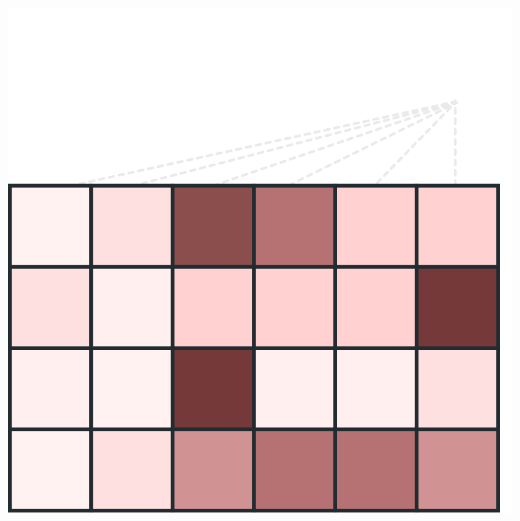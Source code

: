 \documentclass[xetex,aspectratio=169,xcolor,professionalfonts,hyperref]{beamer}
\begin{document}
\begin{frame}
\begin{columns}
\begin{column}{0.39\columnwidth}
            \vspace{-1.5cm}
            \begin{center}
                \includegraphics[width=0.8\columnwidth]{figures/multiple_heads.pdf}
            \end{center}
        \end{column}
    \end{columns}
\end{frame}
\end{document}
